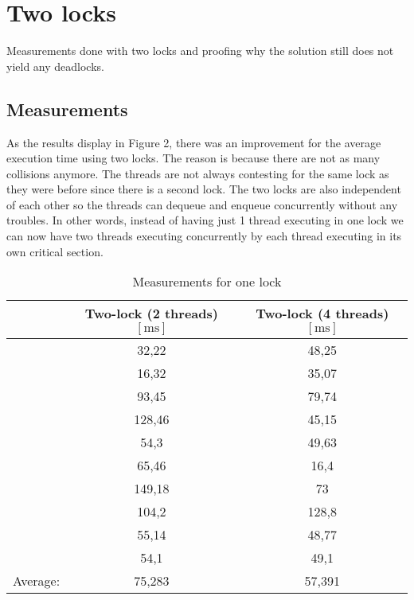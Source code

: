 \documentclass[a4paper,11pt,twoside,fleqn]{article}
\begin{document}
\section{Two locks}
Measurements done with two locks and proofing why the solution still does not yield any deadlocks.

\subsection{Measurements}

As the results display in Figure 2, there was an improvement for the average execution time using two locks. The reason is because there are not as many collisions anymore. The threads are not always contesting for the same lock as they were before since there is a second lock. The two locks are also independent of each other so the threads can dequeue and enqueue concurrently without any troubles. In other words, instead of having just 1 thread executing in one lock we can now have two threads executing concurrently by each thread executing in its own critical section.

\begin {table}[H]
\caption {Measurements for one lock}\label{tab:title} 
\begin{center}
\begin{tabulary}{0.7\linewidth}{sSS}
\toprule
        & \textnormal{Two-lock (2 threads)}$[\si{\milli\second}]$ & \textnormal{Two-lock (4 threads)}$[\si{\milli\second}]$ \\
\midrule
                      & 32,22                 & 48,25  \\
                      & 16,32                 & 35,07  \\
                      & 93,45                 & 79,74  \\
                      & 128,46                & 45,15  \\
                      & 54,3                  & 49,63  \\
                      & 65,46                 & 16,4   \\
                      & 149,18                & 73     \\
                      & 104,2                 & 128,8  \\
                      & 55,14                 & 48,77  \\
                      & 54,1                  & 49,1   \\
\midrule
Average:        & 75,283                & 57,391 \\
\bottomrule
\end{tabulary}
\end{center}
\end {table}
\end{document}
